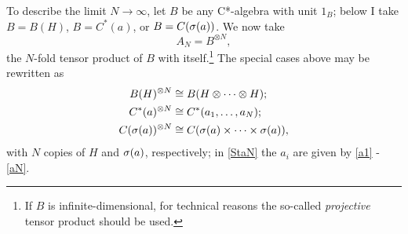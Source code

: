 \documentclass[11pt,a4paper]{article}
\numberwithin{equation}{section}
\newcommand{\er}{\eqref}
\newcommand{\beq}{\begin{equation}}
\newcommand{\eeq}{\end{equation}}
\newcommand{\raw}{\rightarrow}
\newcommand{\ot}{\otimes}
\newcommand{\x}{\times}
\begin{document}
 To describe the limit $N\raw\infty$, let $B$ be any C*-algebra with unit $1_B$;  below I take $B=B(H)$, $B=C^*(a)$,  or $B=C(\sigma(a))$. 
 We now take
 \beq
 A_N=B^{\ot N},
 \eeq
  the $N$-fold tensor product 
  of $B$ with itself.\footnote{If $B$ is infinite-dimensional, for technical reasons  the so-called \emph{projective} tensor product should be used.} The  special cases above may  be rewritten as
\begin{align}
B(H)^{\ot N}&\cong  B(H\ot \cdots \ot H);\label{BHN}\\
C^*(a)^{\ot N}&\cong C^*(a_1, \ldots, a_N);\label{StaN} \\
C(\sg(a))^{\ot N}&\cong  C(\sg(a) \x\cdots\x\sg(a)), \label{sgN}
\end{align}
 with $N$ copies of $H$ and $\sigma(a)$, respectively; in \er{StaN} the $a_i$ are given by \er{a1} - \er{aN}.
 
\end{document}
